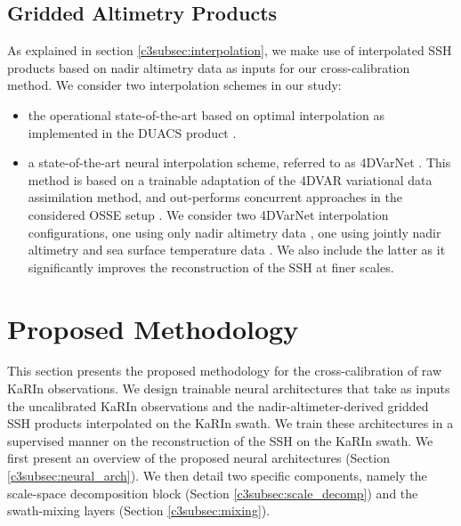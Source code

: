 \begin{bibunit}
\subsection{Gridded Altimetry Products}
\label{c3subsec:mapping}
\noindent
As explained in section \ref{c3subsec:interpolation}, we make use of interpolated SSH products based on
nadir altimetry data as inputs for our cross-calibration method.
We consider two interpolation schemes in our study:
\begin{itemize}
    \item the operational state-of-the-art based on optimal interpolation as implemented in the DUACS product \cite{taburet_duacs_2019}.
    \item a state-of-the-art neural interpolation scheme, referred to as 4DVarNet \cite{fablet_joint_2021}. This method is based on a trainable adaptation of the 4DVAR \cite{carrassi_data_2018} variational data assimilation method, and out-performs concurrent approaches in the considered OSSE setup \cite{osse_data_challenge}. We consider two 4DVarNet interpolation configurations, one using only nadir altimetry data \cite{Beauchamp_Febvre_Georgenthum_Fablet_2022}, one using jointly nadir altimetry and sea surface temperature data \cite{Fablet_Febvre_Chapron_2022}. We also include the latter as it significantly improves the reconstruction of the SSH at finer scales.
    
\end{itemize}

\section{Proposed Methodology}
\label{c3sec:method}
\noindent


This section presents the proposed methodology for the cross-calibration of raw KaRIn observations.
We design trainable neural architectures that take as inputs the uncalibrated KaRIn observations and the nadir-altimeter-derived gridded SSH products interpolated on the KaRIn swath. We train these architectures in a supervised manner on the reconstruction of the SSH on the KaRIn swath.
We first present an overview of the proposed neural architectures (Section \ref{c3subsec:neural_arch}). We then detail two specific components, namely the  scale-space decomposition block (Section \ref{c3subsec:scale_decomp}) and the swath-mixing layers (Section \ref{c3subsec:mixing}).


\end{bibunit}
